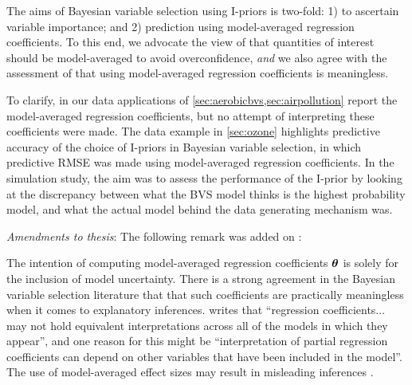 \documentclass[11pt,openright,twoside]{report}
\begin{document}
\begin{enumerate}
  The aims of Bayesian variable selection using I-priors is two-fold: 1) to ascertain variable importance; and 2) prediction using model-averaged regression coefficients.
  To this end, we advocate the view of \citet{madigan1994model,hoeting1999bayesian} that quantities of interest should be model-averaged to avoid overconfidence, \emph{and} we also agree with the assessment of \citet{banner2017considerations,cade2015model} that using model-averaged regression coefficients is meaningless.
  
  To clarify, in our data applications of \cref{sec:aerobicbvs,sec:airpollution} report the model-averaged regression coefficients, but no attempt of interpreting these coefficients were made.
  The data example in \cref{sec:ozone} highlights predictive accuracy of the choice of I-priors in Bayesian variable selection, in which predictive RMSE was made using model-averaged regression coefficients.
  In the simulation study, the aim was to assess the performance of the I-prior by looking at the discrepancy between what the BVS model thinks is the highest probability model, and what the actual model behind the data generating mechanism was.
  
  \textit{Amendments to thesis}: The following remark was added on :

\begin{displayquote}
  The intention of computing model-averaged regression coefficients ${\bm\theta}$ is solely for the inclusion of model uncertainty.  
  There is a strong agreement in the Bayesian variable selection literature that that such coefficients are practically meaningless when it comes to explanatory inferences.
  \citet{banner2017considerations} writes that ``regression coefficients... may not hold equivalent interpretations across all of the models in which they appear'', and one reason for this might be ``interpretation of partial regression coefficients can depend on other variables that have been included in the model''.
  The use of model-averaged effect sizes may result in misleading inferences \citep{cade2015model}.
\end{displayquote} 

\end{enumerate}

\cleardoublepage
\singlespacing
\pagestyle{plain}
\printbibliography
\end{document}
